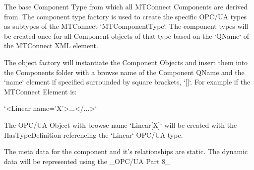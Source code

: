 The base Component Type from which all MTConnect Components are derived from. The 
component type factory is used to create the specific OPC/UA types as subtypes of the 
MTConnect `MTComponentType`. The component types will be created once for all Component objects 
of that type based on the `QName` of the MTConnect XML element. 

The object factory will instantiate the Component Objects and insert them into the Components 
folder with a browse name of the Component QName and the `name` element if specified surrounded 
by square brackets, `[]`. For example if the MTConnect Element is:

`<Linear name='X'>...</...>`

The OPC/UA Object with browse name `Linear[X]` will be created with the HasTypeDefinition 
referencing the `Linear` OPC/UA type. 

The meta data for the component and it's relationships are static. The dynamic data will be 
represented using the _OPC/UA Part 8_ 



